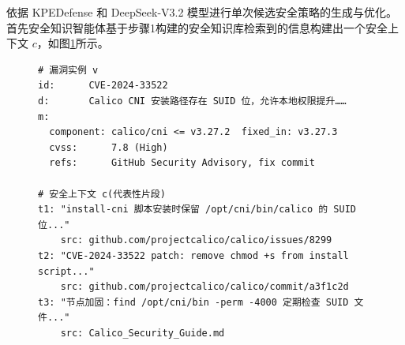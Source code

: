 依据 KPEDefense 和 DeepSeek-V3.2 模型进行单次候选安全策略的生成与优化。首先安全知识智能体基于步骤1构建的安全知识库检索到的信息构建出一个安全上下文 $c$，如图\ref{fig:chap3-v-context}所示。
\begin{figure}[htb!]
    \centering
    \setlength{\abovecaptionskip}{3pt}
    \setlength{\belowcaptionskip}{0pt}
    \begin{tcolorbox}[enhanced,colback=gray!3,colframe=gray!55,boxrule=0.4pt,arc=1mm,left=2mm,right=2mm,top=0.5mm,bottom=0.5mm,fonttitle=\bfseries,coltitle=black]
    \begin{BVerbatim}[fontsize=\small,baselinestretch=0.8]
# 漏洞实例 v
id:      CVE-2024-33522
d:       Calico CNI 安装路径存在 SUID 位，允许本地权限提升……
m:
  component: calico/cni <= v3.27.2  fixed_in: v3.27.3
  cvss:      7.8 (High)
  refs:      GitHub Security Advisory, fix commit

# 安全上下文 c(代表性片段)
t1: "install-cni 脚本安装时保留 /opt/cni/bin/calico 的 SUID 位..."
    src: github.com/projectcalico/calico/issues/8299
t2: "CVE-2024-33522 patch: remove chmod +s from install script..."
    src: github.com/projectcalico/calico/commit/a3f1c2d
t3: "节点加固：find /opt/cni/bin -perm -4000 定期检查 SUID 文件..."
    src: Calico_Security_Guide.md
    \end{BVerbatim}
    \end{tcolorbox}
    \label{fig:chap3-v-context}
\end{figure}
